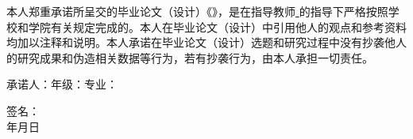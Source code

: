 
{\sanhao %
	
	本人郑重承诺所呈交的毕业论文（设计）《\quad \hbnutitle \quad 》，是在指导教师\underline{ \quad \advisor \quad }的指导下严格按照学校和学院有关规定完成的。本人在毕业论文（设计）中引用他人的观点和参考资料均加以注释和说明。本人承诺在毕业论文（设计）选题和研究过程中没有抄袭他人的研究成果和伪造相关数据等行为，若有抄袭行为，由本人承担一切责任。
	
	\vspace{80pt}
	承诺人：\qquad \qquad 年级：\qquad \qquad 专业：\qquad \qquad
	\vspace{60pt}
	
	\hfill 签名：\hspace*{10cm}\\
	
	\vspace{30pt} 
	\hfill 年\hspace{26pt}月\hspace{26pt}日\hspace*{2cm}
}	
